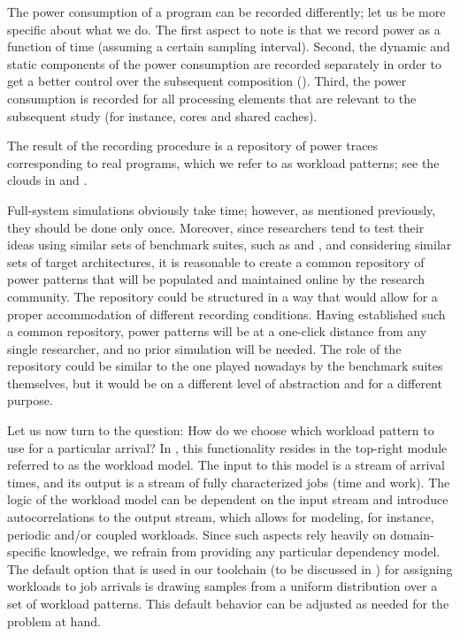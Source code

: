 The power consumption of a program can be recorded differently; let us be more
specific about what we do. The first aspect to note is that we record power as a
function of time (assuming a certain sampling interval). Second, the dynamic and
static components of the power consumption are recorded separately in order to
get a better control over the subsequent composition ().
Third, the power consumption is recorded for all processing elements that are
relevant to the subsequent study (for instance, cores and shared caches).

The result of the recording procedure is a repository of power traces
corresponding to real programs, which we refer to as workload patterns; see the
clouds in  and .

Full-system simulations obviously take time; however, as mentioned previously,
they should be done only once. Moreover, since researchers tend to test their
ideas using similar sets of benchmark suites, such as 
\cite{bienia2011} and  \cite{cpu2006}, and considering similar
sets of target architectures, it is reasonable to create a common repository of
power patterns that will be populated and maintained online by the research
community. The repository could be structured in a way that would allow for a
proper accommodation of different recording conditions. Having established such
a common repository, power patterns will be at a one-click distance from any
single researcher, and no prior simulation will be needed. The role of the
repository could be similar to the one played nowadays by the benchmark suites
themselves, but it would be on a different level of abstraction and for a
different purpose.

Let us now turn to the question: How do we choose which workload pattern to use
for a particular arrival? In , this functionality resides in the
top-right module referred to as the workload model. The input to this model is a
stream of arrival times, and its output is a stream of fully characterized jobs
(time and work). The logic of the workload model can be dependent on the input
stream and introduce autocorrelations to the output stream, which allows for
modeling, for instance, periodic and/or coupled workloads. Since such aspects
rely heavily on domain-specific knowledge, we refrain from providing any
particular dependency model. The default option that is used in our toolchain
(to be discussed in ) for assigning workloads to job arrivals is
drawing samples from a uniform distribution over a set of workload patterns.
This default behavior can be adjusted as needed for the problem at hand.

